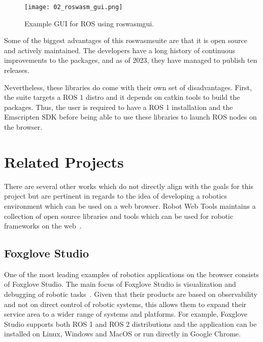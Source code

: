         \begin{figure}[htbp]
            \centering
            \texttt{[image: 02\_roswasm\_gui.png]}
            \caption{Example \ac{GUI} for ROS using \textsf{roswasm\smallunderscore  gui}.}
            \label{fig:roswasm_gui}
        \end{figure}

        Some of the biggest advantages of this \textsf{roswasm\smallunderscore  suite} are that it is open source and actively maintained. The developers have a long history of continuous improvements to the packages, and as of 2023, they have managed to publish ten releases. 

        Nevertheless, these libraries do come with their own set of disadvantages. First, the suite targets a \ac{ROS} 1 distro and it depends on \textsf{catkin} tools to build the packages. Thus, the user is required to have a \ac{ROS} 1 installation and the Emscripten \ac{SDK} before being able to use these libraries to launch \ac{ROS} nodes on the browser.


\section{Related Projects}

    There are several other works which do not directly align with the goals for this project but are pertinent in regards to the idea of developing a robotics environment which can be used on a web browser. Robot Web Tools maintains a collection of open source libraries and tools which can be used for robotic frameworks on the web~\cite{robotwebtools}.
    
    \subsection{Foxglove Studio}

        One of the most leading examples of robotics applications on the browser consists of Foxglove Studio. The main focus of Foxglove Studio is visualization and debugging of robotic tasks~\cite{foxglove}. Given that their products are based on observability and not on direct control of robotic systems, this allows them to expand their service area to a wider range of systems and platforms. For example, Foxglove Studio supports both \ac{ROS} 1 and \ac{ROS} 2 distributions and the application can be installed on Linux, Windows and MacOS or run directly in Google Chrome.
        
